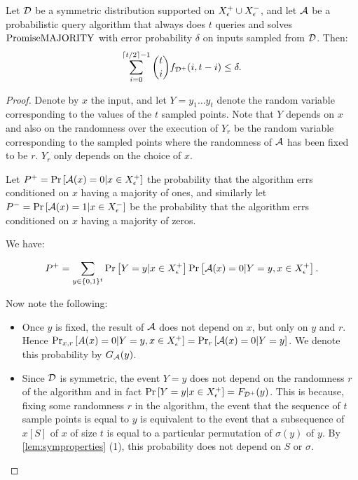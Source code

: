 


\begin{lemma}
\label{lem:symmetricbound}
Let $\mathcal{D}$ be a symmetric distribution supported on $X^+_\epsilon \cup X^-_\epsilon$,
 and let $\mathcal{A}$ be a probabilistic query algorithm
that always does $t$ queries and solves $\mathrm{PromiseMAJORITY}$ with error probability $\delta$ 
on inputs sampled from $\mathcal{D}$. 
Then:
$$
\sum_{i=0}^{\lceil t/2 \rceil-1} \binom{t}{i} f_{\mathcal{D}^+}(i, t-i) \leq \delta.
$$
\end{lemma}
\begin{proof}
Denote by $x$ the input, and let $Y = y_1 \ldots y_t$ denote the random variable corresponding
to the values of the $t$ sampled points. Note that $Y$ depends on $x$ and also on the randomness
over the execution of $Y_r$ be the random variable corresponding to the sampled points where
the randomness of $\mathcal{A}$ has been fixed to be $r$. $Y_r$ only depends on the choice of $x$.

Let $P^+ = \text{Pr}\left[\mathcal{A}(x) = 0 | x \in X^+_\epsilon\right]$ the probability that the algorithm errs
conditioned on $x$ having a majority of ones, and similarly let 
$P^- = \text{Pr}\left[\mathcal{A}(x) = 1 | x \in X^-_\epsilon\right]$ be the probability that the algorithm errs conditioned
on $x$ having a majority of zeros.

We have:

$$
P^+ = \sum_{y\in \{0, 1\}^t} \text{Pr}\left[Y = y | x \in X^+_\epsilon\right] \text{Pr}\left[\mathcal{A}(x) = 0 | Y = y, x \in X^+_\epsilon\right].
$$

Now note the following:

\begin{itemize}
    \item Once $y$ is fixed, the result of $\mathcal{A}$ does not depend on $x$, but only on $y$ and $r$.
    Hence $\text{Pr}_{x,r}\left[A(x) = 0 | Y = y, x \in X^+_\epsilon\right] = \text{Pr}_{r}\left[\mathcal{A}(x) = 0 | Y = y\right]$.
    We denote this probability by $G_{\mathcal{A}}(y)$.
    \item Since $\mathcal{D}$ is symmetric, the event $Y = y$ does not depend on the
    randomness $r$ of the algorithm and in fact $\text{Pr}\left[Y = y | x \in X^+_\epsilon\right] = F_{\mathcal{D}^+}(y)$.
    This is because, fixing some randomness $r$ in the algorithm, the event that the sequence
    of $t$ sample points is equal to $y$ is equivalent to the event that a subsequence of
    $x[S]$ of $x$ of size $t$ is equal to a particular permutation of $\sigma(y)$ of $y$. 
    By \cref{lem:symproperties} (1), this probability does not depend on $S$ or $\sigma$.
\end{itemize}


\end{proof}
